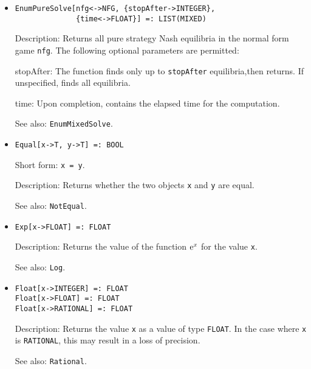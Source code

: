 \begin{itemize}
\item
\protect \large \begin{verbatim}
EnumPureSolve[nfg<->NFG, {stopAfter->INTEGER}, 
              {time<->FLOAT}] =: LIST(MIXED) 
\end{verbatim}\normalsize

\bd
\item
[Description:] Returns all pure strategy Nash equilibria in the
normal form game \verb+nfg+.  The following optional parameters are
permitted:
\bd
\item
[stopAfter:] The function finds only up to \verb+stopAfter+ equilibria,then returns.  If unspecified, finds all equilibria.
\item
[time:] Upon completion, contains the elapsed time for the computation.
\ed
\item
[See also:] {\tt EnumMixedSolve}.
\ed

\item
\protect \large \begin{verbatim}
Equal[x->T, y->T] =: BOOL
\end{verbatim}\normalsize

\bd
\item
[Short form:] \verb+x = y+.
\item
[Description:] Returns whether the two objects \verb+x+ and \verb+y+ are
equal.
\item
[See also:] {\tt NotEqual}.
\ed

\item
\protect \large \begin{verbatim}
Exp[x->FLOAT] =: FLOAT
\end{verbatim} \normalsize

\bd
\item
[Description:] Returns the value of the function ${\rm e}^{x}$ for the
value \verb+x+.
\item
[See also:] {\tt Log}.
\ed



\item
\protect \large \begin{verbatim}
Float[x->INTEGER] =: FLOAT
Float[x->FLOAT] =: FLOAT
Float[x->RATIONAL] =: FLOAT
\end{verbatim} \normalsize

\bd
\item
[Description:] Returns the value \verb+x+ as a value of type {\tt FLOAT}.
In the case where \verb+x+ is {\tt RATIONAL}, this may result in a loss
of precision.
\item
[See also:] {\tt Rational}.
\ed


\end{itemize}
